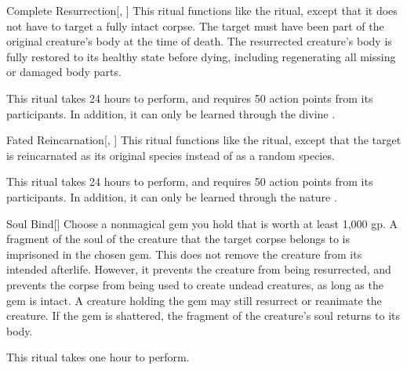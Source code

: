 \lowercase{\hypertarget{spell:Complete Resurrection}{}}\label{spell:Complete Resurrection}
\begin{apability}[Rank 6]{\hypertarget{spell:Complete Resurrection}{Complete Resurrection}}[, ]
This ritual functions like the  ritual, except that it does not have to target a fully intact corpse.
The target must have been part of the original creature's body at the time of death.
The resurrected creature's body is fully restored to its healthy state before dying, including regenerating all missing or damaged body parts.

This ritual takes 24 hours to perform, and requires 50 action points from its participants.
In addition, it can only be learned through the divine .
\end{apability}
\vspace{0.25em}



\lowercase{\hypertarget{spell:Fated Reincarnation}{}}\label{spell:Fated Reincarnation}
\begin{apability}[Rank 6]{\hypertarget{spell:Fated Reincarnation}{Fated Reincarnation}}[, ]
This ritual functions like the  ritual, except that the target is reincarnated as its original species instead of as a random species.

This ritual takes 24 hours to perform, and requires 50 action points from its participants.
In addition, it can only be learned through the nature .
\end{apability}
\vspace{0.25em}



\lowercase{\hypertarget{spell:Soul Bind}{}}\label{spell:Soul Bind}
\begin{apability}[Rank 6]{\hypertarget{spell:Soul Bind}{Soul Bind}}[]
Choose a nonmagical gem you hold that is worth at least 1,000 gp.
A fragment of the soul of the creature that the target corpse belongs to is imprisoned in the chosen gem.
This does not remove the creature from its intended afterlife.
However, it prevents the creature from being resurrected, and prevents the corpse from being used to create undead creatures, as long as the gem is intact.
A creature holding the gem may still resurrect or reanimate the creature.
If the gem is shattered, the fragment of the creature's soul returns to its body.

This ritual takes one hour to perform.
\end{apability}
\vspace{0.25em}



